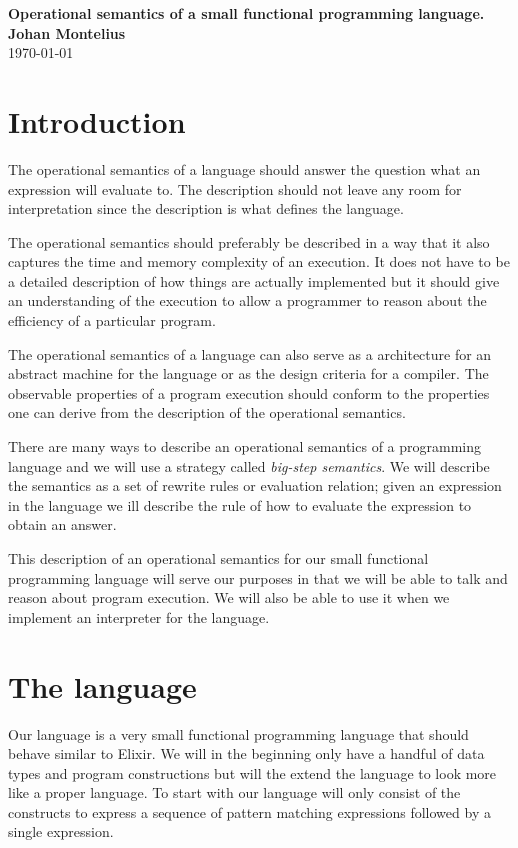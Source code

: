 \documentclass[a4paper,11pt]{article}
\newcommand{\nnsection}[1]{
\section*{#1}
\addcontentsline{toc}{section}{#1}
}
\begin{document}
\begin{center}
\vspace{20pt}
\textbf{\large Operational semantics of a small functional programming language.}\\
\vspace{10pt}
\textbf{Johan Montelius}\\
\vspace{10pt}
\today{}
\end{center}


\nnsection{Introduction}

The operational semantics of a language should answer the question
what an expression will evaluate to. The description should not leave
any room for interpretation since the description is what defines the
language.

The operational semantics should preferably be described in a way that
it also captures the time and memory complexity of an execution. It
does not have to be a detailed description of how things are actually
implemented but it should give an understanding of the execution to
allow a programmer to reason about the efficiency of a particular
program.

The operational semantics of a language can also serve as a
architecture for an abstract machine for the language or as the design
criteria for a compiler. The observable properties of a program
execution should conform to the properties one can derive from the
description of the operational semantics.

There are many ways to describe an operational semantics of a
programming language and we will use a strategy called {\em big-step
  semantics}. We will describe the semantics as a set of rewrite rules
or evaluation relation; given an expression in the language we ill
describe the rule of how to evaluate the expression to obtain an
answer.

This description of an operational semantics for our small functional
programming language will serve our purposes in that we will be able
to talk and reason about program execution. We will also be able to
use it when we implement an interpreter for the language.


\section{The language}

Our language is a very small functional programming language that
should behave similar to Elixir. We will in the beginning only have a
handful of data types and program constructions but will the extend
the language to look more like a proper language. To start with our
language will only consist of the constructs to express a sequence of
pattern matching expressions followed by a single expression.
\end{document}
